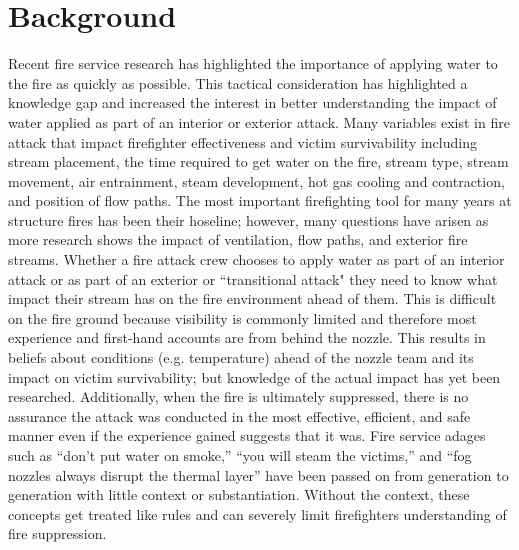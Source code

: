 \documentclass{article}
\begin{document}
\newpage

\tableofcontents

\newpage

\section{Background}

Recent fire service research has highlighted the importance of applying water to the fire as quickly as possible. This tactical consideration has highlighted a knowledge gap and increased the interest in better understanding the impact of water applied as part of an interior or exterior attack. Many variables exist in fire attack that impact firefighter effectiveness and victim survivability including stream placement, the time required to get water on the fire, stream type, stream movement, air entrainment, steam development, hot gas cooling and contraction, and position of flow paths. The most important firefighting tool for many years at structure fires has been their hoseline; however, many questions have arisen as more research shows the impact of ventilation, flow paths, and exterior fire streams. Whether a fire attack crew chooses to apply water as part of an interior attack or as part of an exterior or ``transitional attack" they need to know what impact their stream has on the fire environment ahead of them. This is difficult on the fire ground because visibility is commonly limited and therefore most experience and first-hand accounts are from behind the nozzle. This results in beliefs about conditions (e.g. temperature) ahead of the nozzle team and its impact on victim survivability; but knowledge of the actual impact has yet been researched. Additionally, when the fire is ultimately suppressed, there is no assurance the attack was conducted in the most effective, efficient, and safe manner even if the experience gained suggests that it was. Fire service adages such as ``don’t put water on smoke,'' ``you will steam the victims,'' and ``fog nozzles always disrupt the thermal layer'' have been passed on from generation to generation with little context or substantiation. Without the context, these concepts get treated like rules and can severely limit firefighters understanding of fire suppression.
\end{document}
